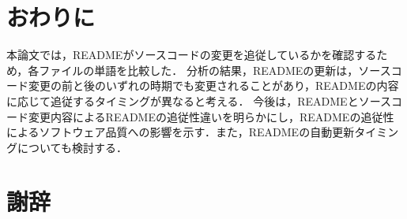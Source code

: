 \documentclass[uplatex,dvipdfmx,a4paper,twocolumn,base=11pt,jbase=11pt,ja=standard]{bxjsarticle}  %
\begin{document}


\section{おわりに}




本論文では，READMEがソースコードの変更を追従しているかを確認するため，各ファイルの単語を比較した．
分析の結果，READMEの更新は，ソースコード変更の前と後のいずれの時期でも変更されることがあり，READMEの内容に応じて追従するタイミングが異なると考える．
今後は，READMEとソースコード変更内容によるREADMEの追従性違いを明らかにし，READMEの追従性によるソフトウェア品質への影響を示す．また，READMEの自動更新タイミングについても検討する．



\section*{謝辞}









\end{document}
